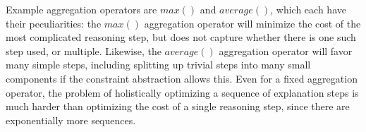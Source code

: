 Example aggregation operators are $max()$ and $average()$, which each have their peculiarities: the $max()$ aggregation operator will minimize the cost of the most complicated reasoning step, but does not capture whether there is one such step used, or multiple. Likewise, the $average()$ aggregation operator will favor many simple steps, including splitting up trivial steps into many small components if the constraint abstraction allows this.
% 
Even for a fixed aggregation operator, the problem of holistically optimizing a sequence of explanation steps is much harder than optimizing the cost of a single reasoning step, since there are exponentially more sequences. 
